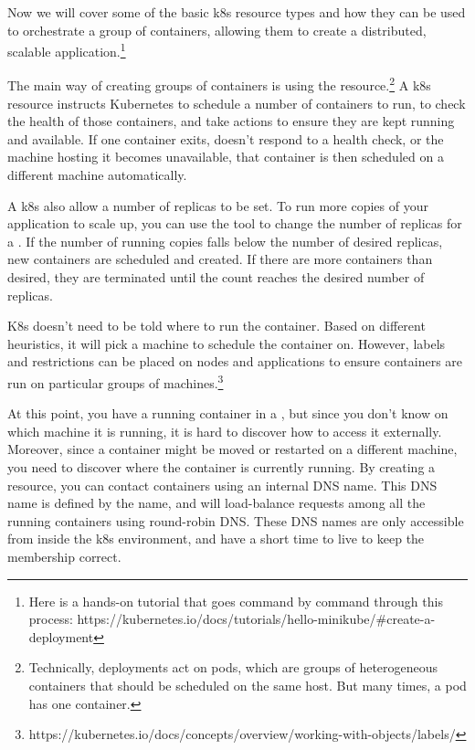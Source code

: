 \documentclass[11pt,twoside]{article}
\begin{document}
Now we will cover some of the basic k8s resource types and how they can be used to orchestrate
a group of containers, allowing them to create a distributed, scalable application.\footnote{
Here is a hands-on tutorial that goes command by command through this process:
https://kubernetes.io/docs/tutorials/hello-minikube/\#create-a-deployment}

The main way of creating groups of containers is using the  resource.\footnote{
Technically, deployments act on pods, which are groups of heterogeneous containers that should be
scheduled on the same host.  But many times, a pod has one container.}
A k8s  resource instructs Kubernetes to schedule a number of containers to run,
to check the health of those containers,
and take actions to ensure they are kept running and available.  If one container exits, doesn't respond
to a health check, or the machine hosting it becomes unavailable, that container is then scheduled
on a different machine automatically. 

A k8s  also allow a number of replicas to be set.  To run more copies of your application to
scale up, you can use the  tool to change the number of replicas for
a .  If the number of running copies falls below the number of desired replicas, new
containers are scheduled and created.  If there are more containers than desired, they are terminated
until the count reaches the desired number of replicas.

K8s doesn't need to be told where to run the container.  Based on different heuristics,
it will pick a machine to schedule the container on.  However, labels and restrictions can be placed
on nodes and applications to ensure containers are run on particular groups of machines.\footnote{
https://kubernetes.io/docs/concepts/overview/working-with-objects/labels/}

At this point, you have a running container in a , but since you don't know on which
machine it is running, it is hard to discover how to access it externally.
Moreover, since a container might be moved or restarted on a different machine, you need to discover
where the container is currently running.  By creating
a  resource, you can contact containers using an internal DNS name.
This DNS name is defined by the  name, and will load-balance
requests among all the running containers using round-robin DNS.  These DNS names are only accessible
from inside the k8s environment, and have a short time to live to keep the membership correct.
\end{document}
